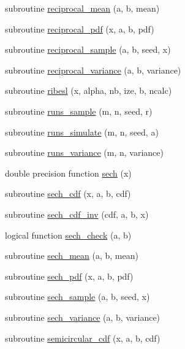 \begin{DoxyCompactItemize}
\item 
subroutine \hyperlink{subroutines_8f_ac0440a31997ff53e6f93ce9ee20af3ec}{reciprocal\+\_\+mean} (a, b, mean)
\item 
subroutine \hyperlink{subroutines_8f_a450f3e05aa915649721ddf2d61bf47fa}{reciprocal\+\_\+pdf} (x, a, b, pdf)
\item 
subroutine \hyperlink{subroutines_8f_abdaf248fa3bc68293411d44d881e2865}{reciprocal\+\_\+sample} (a, b, seed, x)
\item 
subroutine \hyperlink{subroutines_8f_a3c7e3917a239f43779f620c2e5863720}{reciprocal\+\_\+variance} (a, b, variance)
\item 
subroutine \hyperlink{subroutines_8f_a7388ce0c1e1baabe68d488afdddf9f76}{ribesl} (x, alpha, nb, ize, b, ncalc)
\item 
subroutine \hyperlink{subroutines_8f_a547f8f40db56f1abdf6d11537ff1ac85}{runs\+\_\+sample} (m, n, seed, r)
\item 
subroutine \hyperlink{subroutines_8f_a84945493088e8f98d15cf401c100e82c}{runs\+\_\+simulate} (m, n, seed, a)
\item 
subroutine \hyperlink{subroutines_8f_aa77c037b8f90a49ff7a1d9f4dde58aeb}{runs\+\_\+variance} (m, n, variance)
\item 
double precision function \hyperlink{subroutines_8f_a1749f7d18d74526e8948745e077f05d6}{sech} (x)
\item 
subroutine \hyperlink{subroutines_8f_ac322fce1f5c0595f018644a3a250015d}{sech\+\_\+cdf} (x, a, b, cdf)
\item 
subroutine \hyperlink{subroutines_8f_a48c395063f1fe4584b741fd7b8c20ca3}{sech\+\_\+cdf\+\_\+inv} (cdf, a, b, x)
\item 
logical function \hyperlink{subroutines_8f_aaa8b88a5a18965765dd105f35f27334e}{sech\+\_\+check} (a, b)
\item 
subroutine \hyperlink{subroutines_8f_a3883c0db4be7be699a5beeed32adb504}{sech\+\_\+mean} (a, b, mean)
\item 
subroutine \hyperlink{subroutines_8f_a688a7b361741dad3d269d8081b912f76}{sech\+\_\+pdf} (x, a, b, pdf)
\item 
subroutine \hyperlink{subroutines_8f_a3b87004baabafee7ad7ec925d02fbffa}{sech\+\_\+sample} (a, b, seed, x)
\item 
subroutine \hyperlink{subroutines_8f_a2520eac72066583e24fc121018b6ba2e}{sech\+\_\+variance} (a, b, variance)
\item 
subroutine \hyperlink{subroutines_8f_a4bd980f50e41d09ed86abca21d3dfa14}{semicircular\+\_\+cdf} (x, a, b, cdf)

\end{DoxyCompactItemize}
